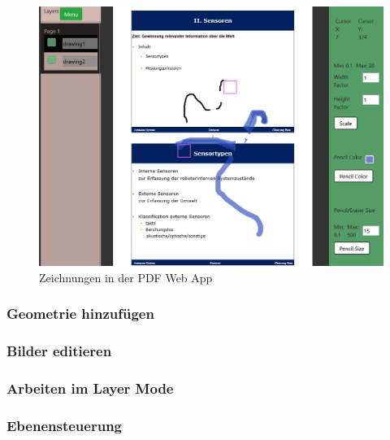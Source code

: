 \begin{figure}[!htbp]
	\centering
	\includegraphics[width=1\textwidth]{"images/drawing.png"}
	\caption{Zeichnungen in der PDF Web App}
	\label{fig:drawing}
\end{figure}


\subsubsection{Geometrie hinzufügen}

\subsubsection{Bilder editieren}

\subsubsection{Arbeiten im Layer Mode}

\subsubsection{Ebenensteuerung}



